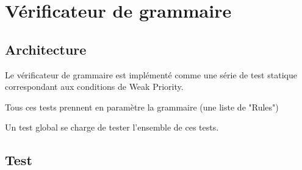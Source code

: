 \section{Vérificateur de grammaire}
	\subsection{Architecture}
	Le vérificateur de grammaire est implémenté comme une série de test
	statique correspondant aux conditions de Weak Priority.
	
	Tous ces tests prennent en paramètre la grammaire (une liste de "Rules")

	Un test global se charge de tester l'ensemble de ces tests.

	\subsection{Test}
